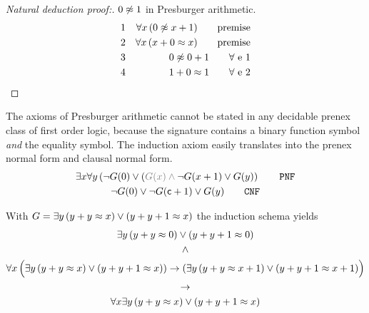 \begin{proof}[Natural deduction proof:] $0\not\approx 1$ in Presburger arithmetic.
	\begin{align*}
	1 & &\forall x\,( 0 \not\approx x + 1 ) \tag*{premise}\\
	2 & &\forall x\,(x + 0 \approx x ) \tag*{premise}\\
	3 & & 0 \not\approx 0 + 1\tag*{$\forall$ e 1} \\
	4 & & 1 + 0 \approx 1\tag*{$\forall$ e 2}
	\end{align*}
\end{proof}

\begin{remark}
	The axioms of Presburger arithmetic 
cannot be stated in any decidable prenex class of first order logic,
because the signature contains a binary function symbol \emph{and} the equality symbol.
The induction axiom easily translates into the prenex normal form and clausal normal form.
\begin{gather*}
	\exists x \forall y \left(
	\lnot G(0) \lor ({\colG G(x)\land{}} \lnot G(x+1) \lor G(y)
	\right)\tag*{\PNF}
	\\
	\lnot G(0) \lor \lnot G(\mc+1) \lor G(y)
	\tag*{\CNF}
\end{gather*}
\end{remark}

\begin{example}\label{ex:presburger:G}
	With $G = \exists y\, (y+y\approx x)\lor(y+y+1\approx x)$
	the induction schema yields
	\begin{gather*}
	{\exists y\, (y+y\approx0)\lor(y+y+1\approx0)}
	\\\land\\
	\forall x\, 
	\Big(\exists y\, (y+y\approx x)\lor(y+y+1\approx x)) 
	\rightarrow 
	(\exists y\, (y+y\approx x+1)\lor(y+y+1\approx x+1)
	\Big)
	\\\rightarrow\\
	\forall x \exists y\, (y+y\approx x)\lor(y+y+1\approx x)
	\end{gather*}
\end{example}



